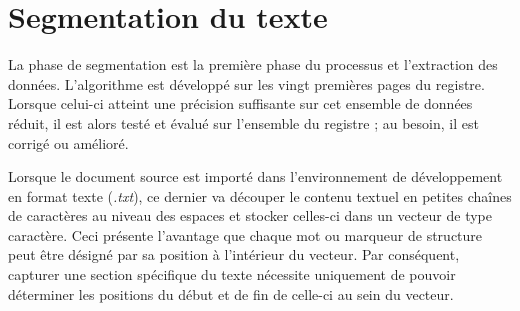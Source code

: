 \section{Segmentation du texte}
La phase de segmentation est la première phase du processus et l'extraction des données.
L'algorithme est développé sur les vingt premières pages du registre. Lorsque celui-ci atteint une précision suffisante sur cet ensemble de données réduit, il est alors testé et évalué sur l'ensemble du registre ; au besoin, il est corrigé ou amélioré.

Lorsque le document source est importé dans l'environnement de développement en format texte (\textit{.txt}), ce dernier va découper le contenu textuel en petites chaînes de caractères au niveau des espaces et stocker celles-ci dans un vecteur de type caractère. Ceci présente l'avantage que chaque mot ou marqueur de structure peut être désigné par sa position à l'intérieur du vecteur. Par conséquent, capturer une section spécifique du texte nécessite uniquement de pouvoir déterminer les positions du début et de fin de celle-ci au sein du vecteur.  


